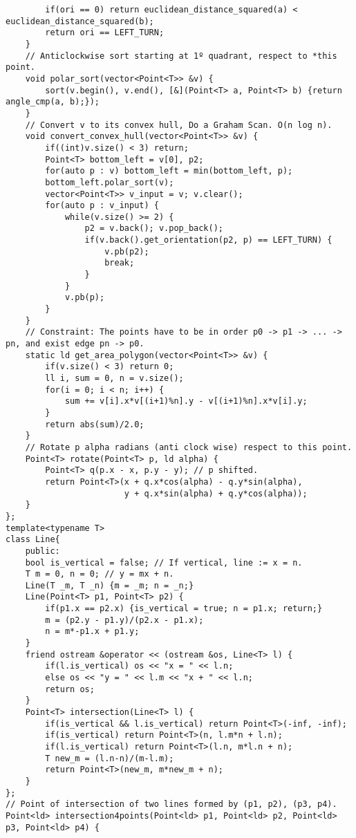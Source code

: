 \documentclass[a4paper]{article}
\begin{document}
\begin{verbatim}
        if(ori == 0) return euclidean_distance_squared(a) < euclidean_distance_squared(b);
        return ori == LEFT_TURN;
    }
    // Anticlockwise sort starting at 1º quadrant, respect to *this point.
    void polar_sort(vector<Point<T>> &v) {
        sort(v.begin(), v.end(), [&](Point<T> a, Point<T> b) {return angle_cmp(a, b);});
    }
    // Convert v to its convex hull, Do a Graham Scan. O(n log n).
    void convert_convex_hull(vector<Point<T>> &v) {
        if((int)v.size() < 3) return;
        Point<T> bottom_left = v[0], p2;
        for(auto p : v) bottom_left = min(bottom_left, p);
        bottom_left.polar_sort(v);
        vector<Point<T>> v_input = v; v.clear();
        for(auto p : v_input) {
            while(v.size() >= 2) {
                p2 = v.back(); v.pop_back();
                if(v.back().get_orientation(p2, p) == LEFT_TURN) {
                    v.pb(p2);
                    break;
                }
            }
            v.pb(p);
        }
    }
    // Constraint: The points have to be in order p0 -> p1 -> ... -> pn, and exist edge pn -> p0.
    static ld get_area_polygon(vector<Point<T>> &v) {
        if(v.size() < 3) return 0;
        ll i, sum = 0, n = v.size();
        for(i = 0; i < n; i++) {
            sum += v[i].x*v[(i+1)%n].y - v[(i+1)%n].x*v[i].y;
        }
        return abs(sum)/2.0;
    }
    // Rotate p alpha radians (anti clock wise) respect to this point.
    Point<T> rotate(Point<T> p, ld alpha) {
        Point<T> q(p.x - x, p.y - y); // p shifted.
        return Point<T>(x + q.x*cos(alpha) - q.y*sin(alpha),
                        y + q.x*sin(alpha) + q.y*cos(alpha));
    }
};
template<typename T>
class Line{
    public:
    bool is_vertical = false; // If vertical, line := x = n.
    T m = 0, n = 0; // y = mx + n.
    Line(T _m, T _n) {m = _m; n = _n;}
    Line(Point<T> p1, Point<T> p2) {
        if(p1.x == p2.x) {is_vertical = true; n = p1.x; return;}
        m = (p2.y - p1.y)/(p2.x - p1.x);
        n = m*-p1.x + p1.y;
    }
    friend ostream &operator << (ostream &os, Line<T> l) {
        if(l.is_vertical) os << "x = " << l.n;
        else os << "y = " << l.m << "x + " << l.n;
        return os;
    }
    Point<T> intersection(Line<T> l) {
        if(is_vertical && l.is_vertical) return Point<T>(-inf, -inf);
        if(is_vertical) return Point<T>(n, l.m*n + l.n);
        if(l.is_vertical) return Point<T>(l.n, m*l.n + n);
        T new_m = (l.n-n)/(m-l.m);
        return Point<T>(new_m, m*new_m + n);
    }
};
// Point of intersection of two lines formed by (p1, p2), (p3, p4).
Point<ld> intersection4points(Point<ld> p1, Point<ld> p2, Point<ld> p3, Point<ld> p4) {

\end{verbatim}
\end{document}
